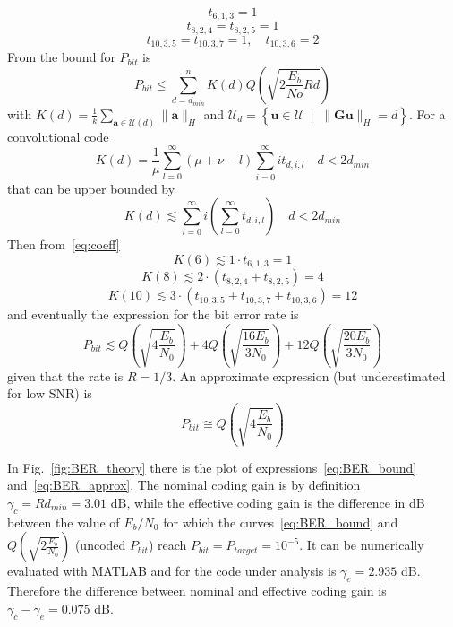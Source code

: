 \documentclass[10pt]{article}
\begin{document}
\begin{equation*}
	t_{6,1,3} = 1
\end{equation*}
\begin{equation}\label{eq:coeff}
	t_{8,2,4} = t_{8,2,5} = 1
\end{equation}
\begin{equation*}
	t_{10, 3, 5} = t_{10, 3, 7} = 1, \quad  t_{10,3,6} = 2
\end{equation*}
From \cite{erseghe} the bound for $P_{bit}$ is
\begin{equation}
	P_{bit} \le \sum_{d=d_{min}}^n K(d)Q\left(\sqrt{2\frac{E_b}{No}Rd}\right)
\end{equation}
with $K(d) = \frac{1}{k} \sum_{\mathbf{a}\in\mathcal{U}(d)} \|\mathbf{a}\|_H$ and $\mathcal{U}_d = \left\{ \mathbf{u} \in \mathcal{U} \; \middle| \; \|\mathbf{Gu} \|_{H} = d \right\}$. For a convolutional code 
\begin{equation}
	K(d) = \frac{1}{\mu}\sum_{l=0}^{\infty} (\mu + \nu - l) \sum_{i=0}^{\infty} i t_{d,i,l} \quad d < 2d_{min}
\end{equation}
that can be upper bounded by
\begin{equation}
	K(d) \lesssim \sum_{i=0}^{\infty} i \left( \sum_{l=0}^{\infty}t_{d,i,l}\right) \quad d < 2d_{min}
\end{equation}
Then from~\eqref{eq:coeff} 
\begin{equation*}
	K(6) \lesssim 1\cdot t_{6,1,3} = 1
\end{equation*}
\begin{equation}
	K(8) \lesssim 2\cdot (t_{8,2,4} + t_{8,2,5}) = 4
\end{equation}
\begin{equation*}
	K(10) \lesssim 3\cdot (t_{10, 3, 5} + t_{10, 3, 7} + t_{10,3,6}) = 12
\end{equation*}
and eventually the expression for the bit error rate is
\begin{equation}\label{eq:BER_bound}
	P_{bit} \lesssim Q\left(\sqrt{4\frac{E_b}{N_0}} \right) + 4Q\left(\sqrt{\frac{16E_b}{3N_0}} \right) + 12Q\left(\sqrt{\frac{20E_b}{3N_0}} \right)
\end{equation}
given that the rate is $R=1/3$. An approximate expression (but underestimated for low SNR) is
\begin{equation}\label{eq:BER_approx}
	P_{bit} \cong Q\left(\sqrt{4\frac{E_b}{N_0}} \right)
\end{equation}

In Fig.~\ref{fig:BER_theory} there is the plot of expressions~\eqref{eq:BER_bound} and~\eqref{eq:BER_approx}. The nominal coding gain is by definition $\gamma_c = Rd_{min} = 3.01$ dB, while the effective coding gain is the difference in dB between the value of $E_b/N_0$ for which the curves~\eqref{eq:BER_bound} and $Q\left(\sqrt{2\frac{E_b}{N_0}}\right)$ (uncoded $P_{bit}$) reach $P_{bit} = P_{target} = 10^{-5}$. It can be numerically evaluated with MATLAB and for the code under analysis is $\gamma_e = 2.935$ dB. Therefore the difference between nominal and effective coding gain is $\gamma_c - \gamma_e = 0.075$ dB.
\end{document}
